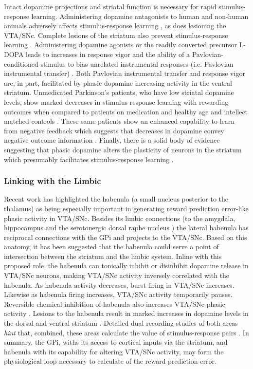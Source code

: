 \documentclass[doc,12pt]{apa}        %
\begin{document}
Intact dopamine projections and striatal function is necessary for rapid stimulus-response learning.  Administering dopamine antagonists to human and non-human animals adversely affects stimulus-response learning \cite{Pizzagalli:2010p7205}, as does lesioning the VTA/SNc.  Complete lesions of the striatum also prevent stimulus-response learning \cite{Packard:2002p5074}.  Administering dopamine agonists or the readily converted precursor L-DOPA leads to increases in response vigor and the ability of a Pavlovian-conditioned stimulus to bias unrelated instrumental responses (i.e. Pavlovian instrumental transfer) \cite{Winterbauer:2007p6352}. Both Pavlovian instrumental transfer and response vigor are, in part, facilitated by phasic dopamine increasing activity in the ventral striatum.  Unmedicated Parkinson's patients, who have low striatal dopamine levels, show marked decreases in stimulus-response learning with rewarding outcomes when compared to patients on medication and healthy age and intellect matched controls \cite{Pizzagalli:2010p7205}.  These same patients show an enhanced capability to learn from negative feedback which suggests that decreases in dopamine convey negative outcome information \cite{Frank:2004p4709}.  Finally, there is a solid body of evidence suggesting that phasic dopamine alters the plasticity of neurons in the striatum which presumably facilitates stimulus-response learning \cite{Calabresi:2007p4284}.

\subsubsection{Linking with the Limbic}
\label{subsub:limbic}
Recent work has highlighted the habenula (a small nucleus posterior to the thalamus) as being especially important in generating reward prediction error-like phasic activity in VTA/SNc.  Besides its limbic connections (to the amygdala, hippocampus and the serotonergic dorsal raphe nucleus \cite{Hikosaka:2008p4455}) the lateral habenula has reciprocal connections with the GPi and projects to the VTA/SNc.  Based on this anatomy, it has been suggested that the habenula could serve a point of intersection between the striatum and the limbic system.  Inline with this proposed role, the habenula can tonically inhibit or disinhibit dopamine release in VTA/SNc neurons, making VTA/SNc activity inversely correlated with the habenula.  As habenula activity decreases, burst firing in VTA/SNc increases.  Likewise as habenula firing increases, VTA/SNc activity temporarily pauses.  Reversible chemical inhibition of habenula also increases VTA/SNc phasic activity \cite{Hikosaka:2008p4455}.  Lesions to the habenula result in marked increases in dopamine levels in the dorsal and ventral striatum \cite{BrombergMartin:2010p7221}.  Detailed dual recording studies of both areas \emph{hint} that, combined, these areas calculate the value of stimulus-response pairs \cite{BrombergMartin:2010p7221}.  In summary, the GPi, withs its access to cortical inputs via the striatum, and habenula with its capability for altering VTA/SNc activity, may form the physiological loop necessary to calculate of the reward prediction error.
\end{document}

